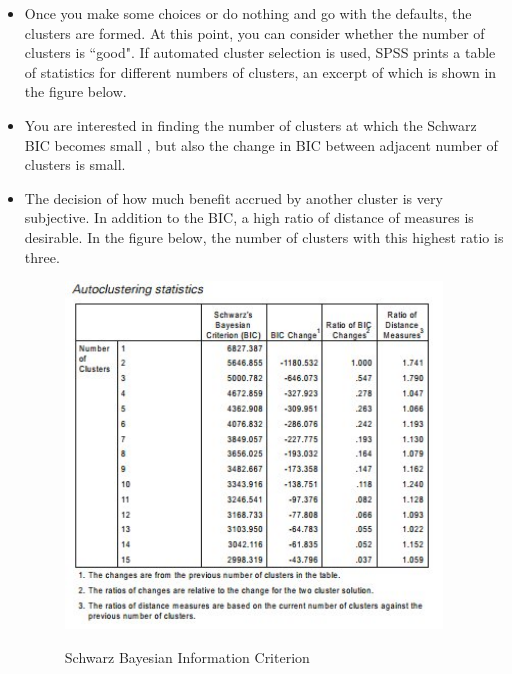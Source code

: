 \documentclass[a4paper,12pt]{article}
\begin{document}
\begin{itemize}
	\item Once you make some choices or do nothing and go with the defaults, the clusters are
	formed. At this point, you can consider whether the number of clusters is ``good". If
	automated cluster selection is used, SPSS prints a table of statistics for different
	numbers of clusters, an excerpt of which is shown in the figure below.
	\item  You are interested
	in finding the number of clusters at which the Schwarz BIC becomes small , but also the change in BIC between
	adjacent number of clusters is small. 
	
	\item The decision of how much benefit accrued by another cluster is very subjective. In addition to the BIC, a high ratio of distance of measures is desirable. In the figure below, the number of clusters with this highest ratio is three.
	
	\begin{figure}[h!]
		\begin{centering}
			\includegraphics[width=10cm]{images/TwoStep1.jpg}\\
			\caption{Schwarz Bayesian Information Criterion}
		\end{centering}
	\end{figure}
\end{itemize}
\end{document}
